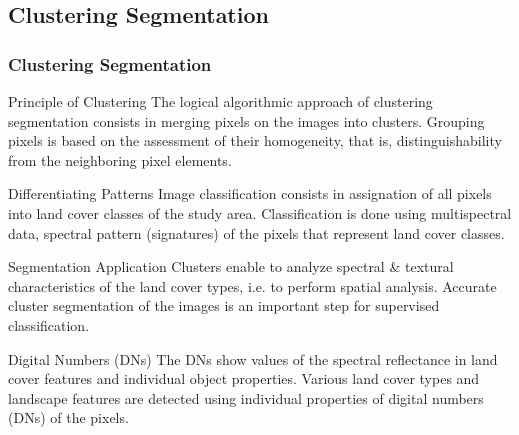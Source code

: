 \documentclass[pdflatex,compress,8pt,
	xcolor={dvipsnames,dvipsnames,svgnames,x11names,table},
	hyperref={colorlinks = true,
	breaklinks = true, 
	urlcolor = NavyBlue, 
	breaklinks = true}]{beamer}
\begin{document}
\subsection{Clustering Segmentation}
\begin{frame}\frametitle{Clustering Segmentation}

\begin{alertblock}{Principle of Clustering}
The logical algorithmic approach of clustering segmentation consists in merging pixels on the images into clusters. Grouping pixels is based on the assessment of their homogeneity, that is, distinguishability from the neighboring pixel elements.
\end{alertblock}

\begin{block}{Differentiating Patterns}
Image classification consists in assignation of all pixels into land cover classes of the study area. Classification is done using multispectral data, spectral pattern (signatures) of the pixels that represent land cover classes.
\end{block}

\begin{block}{Segmentation Application}
Clusters enable to analyze spectral \& textural characteristics of the land cover types, i.e. to perform spatial analysis. Accurate cluster segmentation of the images is an important step for supervised classification.
\end{block}

\begin{examples}{Digital Numbers (DNs)}
The DNs show values of the spectral reflectance in land cover features and individual object properties. Various land cover types and landscape features are detected using individual properties of digital numbers (DNs) of the pixels.
\end{examples}

\end{frame}
\end{document}
